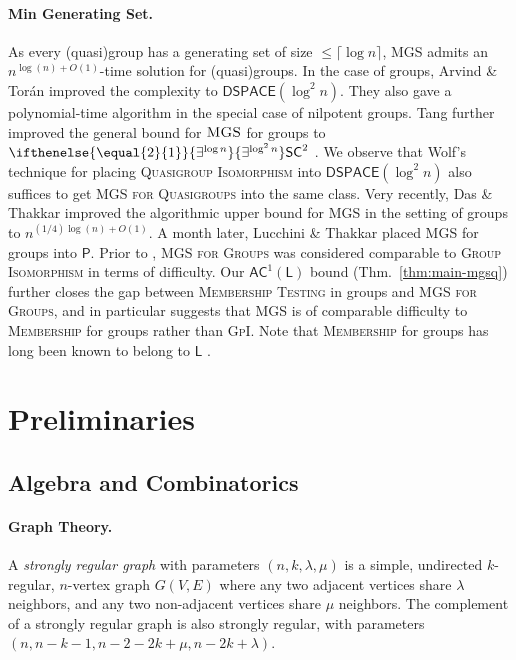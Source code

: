 \documentclass{theoretics}
\newcommand{\algprobm}[1]{\textsc{#1}\xspace}
\newcommand{\betacc}[1]{\ifthenelse{\equal{#1}{1}}{\exists^{\log n}}{\exists^{\log^{#1}n}}} %
\newcommand{\Thm}[1]{Thm.~\ref{#1}\xspace}
\newcommand*{\ComplexityClass}[1]{\ensuremath{\mathsf{#1}}\xspace}
\newcommand*{\LogSpace}{\ComplexityClass{L}}
\newcommand{\AC}{\ComplexityClass{AC}}
\begin{document}
\paragraph{Min Generating Set.} As every (quasi)group has a generating set of size $\leq \lceil \log n \rceil$, \algprobm{MGS} admits an $n^{\log(n) + O(1)}$-time solution for (quasi)groups. In the case of groups, Arvind \& Tor\'an  \cite{ArvindToran} improved the complexity to $\mathsf{DSPACE}(\log^{2} n)$. They also gave a polynomial-time algorithm in the special case of nilpotent groups. Tang further improved the general bound for $\algprobm{MGS}$ for groups to $\betacc{2}\mathsf{SC}^{2}$ \cite{TangThesis}. We observe that Wolf's technique for placing \algprobm{Quasigroup Isomorphism} into $\mathsf{DSPACE}(\log^2 n)$ also suffices to get \algprobm{MGS for Quasigroups} into the same class. Very recently, Das \& Thakkar \cite{DasThakkar} improved the algorithmic upper bound for \algprobm{MGS} in the setting of groups to $n^{(1/4) \log(n) + O(1)}$. A month later, Lucchini \& Thakkar \cite{LucchiniThakkar} placed  \algprobm{MGS} for groups into $\mathsf{P}$. Prior to \cite{LucchiniThakkar}, \algprobm{MGS for Groups} was considered comparable to \algprobm{Group Isomorphism} in terms of difficulty. Our $\AC^{1}(\LogSpace)$ bound  (\Thm{thm:main-mgsq}) further closes the gap between \algprobm{Membership Testing} in groups and \algprobm{MGS for Groups}, and in particular suggests that \algprobm{MGS} is of comparable difficulty to \algprobm{Membership} for groups rather than \algprobm{GpI}. Note that \algprobm{Membership} for groups has long been known to belong to $\LogSpace$ \cite{BarringtonMcKenzie, Reingold}.

\section{Preliminaries}

\subsection{Algebra and Combinatorics}\label{sec:algebraprelims}

\paragraph{Graph Theory.} A \textit{strongly regular graph} with parameters $(n, k, \lambda, \mu)$ is a simple, undirected $k$-regular, $n$-vertex graph $G(V, E)$ where any two adjacent vertices share $\lambda$ neighbors, and any two non-adjacent vertices share $\mu$ neighbors. The complement of a strongly regular graph is also strongly regular, with parameters $(n, n-k-1, n-2-2k+\mu, n-2k+\lambda)$. \\
\end{document}
